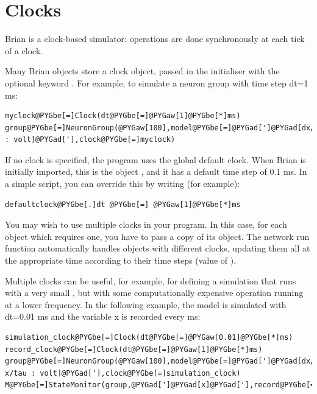 \documentclass[letterpaper,10pt]{manual}
\begin{document}
\resetcurrentobjects
{}

\hypertarget{index-2}{}\section{Clocks}

Brian is a clock-based simulator: operations are done synchronously at each tick of a clock.

Many Brian objects store a clock object, passed in the initialiser with the optional keyword .
For example, to simulate a neuron group with time step dt=1 ms:

\begin{Verbatim}[commandchars=@\[\]]
myclock@PYGbe[=]Clock(dt@PYGbe[=]@PYGaw[1]@PYGbe[*]ms)
group@PYGbe[=]NeuronGroup(@PYGaw[100],model@PYGbe[=]@PYGad[']@PYGad[dx/dt=1*mV/ms : volt]@PYGad['],clock@PYGbe[=]myclock)
\end{Verbatim}

If no clock is specified, the program uses the global default clock. When Brian is initially
imported, this is the object \hyperlink{brian.defaultclock}{}, and it has a default
time step of 0.1 ms. In a simple script, you can override this by writing (for example):

\begin{Verbatim}[commandchars=@\[\]]
defaultclock@PYGbe[.]dt @PYGbe[=] @PYGaw[1]@PYGbe[*]ms
\end{Verbatim}

You may wish to use multiple clocks in your program. In this case,
for each object which requires one, you have to pass a copy of its
\hyperlink{brian.Clock}{} object. The network run function automatically handles objects
with different clocks, updating them all at the appropriate time
according to their time steps (value of \hyperlink{brian.Clock.dt}{}).

Multiple clocks can be useful, for example, for defining a simulation
that runs with a very small , but with some computationally
expensive operation running at a lower frequency. In the following example, the model
is simulated with dt=0.01 ms and the variable x is recorded every ms:

\begin{Verbatim}[commandchars=@\[\]]
simulation_clock@PYGbe[=]Clock(dt@PYGbe[=]@PYGaw[0.01]@PYGbe[*]ms)
record_clock@PYGbe[=]Clock(dt@PYGbe[=]@PYGaw[1]@PYGbe[*]ms)
group@PYGbe[=]NeuronGroup(@PYGaw[100],model@PYGbe[=]@PYGad[']@PYGad[dx/dt=-x/tau : volt]@PYGad['],clock@PYGbe[=]simulation_clock)
M@PYGbe[=]StateMonitor(group,@PYGad[']@PYGad[x]@PYGad['],record@PYGbe[=]@PYGad[']@PYGad[True]@PYGad['],clock@PYGbe[=]record_clock)
\end{Verbatim}
\end{document}
